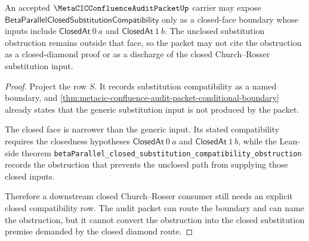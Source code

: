 \begin{theorem}
\label{thm:metacic-confluence-audit-packet-closed-substitution-boundary}
An accepted $\MetaCICConfluenceAuditPacketUp$ carrier may expose
$\mathsf{BetaParallelClosedSubstitutionCompatibility}$ only as a closed-face
boundary whose inputs include $\mathsf{ClosedAt}\ 0\ a$ and
$\mathsf{ClosedAt}\ 1\ b$. The unclosed substitution obstruction remains
outside that face, so the packet may not cite the obstruction as a
closed-diamond proof or as a discharge of the closed Church--Rosser
substitution input.
\end{theorem}
\begin{proof}
Project the row $S$. It records substitution compatibility as a named boundary,
and \autoref{thm:metacic-confluence-audit-packet-conditional-boundary} already
states that the generic substitution input is not produced by the packet.

The closed face is narrower than the generic input. Its stated compatibility
requires the closedness hypotheses $\mathsf{ClosedAt}\ 0\ a$ and
$\mathsf{ClosedAt}\ 1\ b$, while the Lean-side theorem
\texttt{betaParallel\_closed\_substitution\_compatibility\_obstruction} records
the obstruction that prevents the unclosed path from supplying those closed
inputs.

Therefore a downstream closed Church--Rosser consumer still needs an explicit
closed compatibility row. The audit packet can route the boundary and can name
the obstruction, but it cannot convert the obstruction into the closed
substitution premise demanded by the closed diamond route.
\end{proof}

